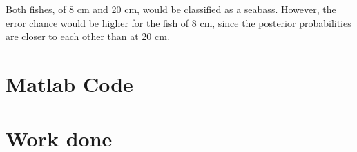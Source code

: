 \documentclass[10pt,a4paper]{article}
\begin{document}
\section{}
\subsection{}
\subsection{}
Both fishes, of 8 cm and 20 cm, would be classified as a seabass. However, the error chance would be higher for the fish of 8 cm, since the posterior probabilities are closer to each other than at 20 cm.

\section{Matlab Code}

\section{Work done}
\end{document}
